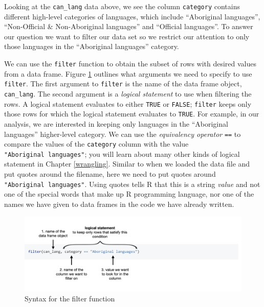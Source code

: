 \documentclass[
]{book}
\begin{document}
Looking at the \texttt{can\_lang} data above, we see the column \texttt{category} contains different
high-level categories of languages, which include ``Aboriginal languages'',
``Non-Official \& Non-Aboriginal languages'' and ``Official languages''. To answer
our question we want to filter our data set so we restrict our attention
to only those languages in the ``Aboriginal languages'' category.

We can use the \texttt{filter}  function to obtain the subset of rows with desired
values from a data frame. Figure \ref{fig:img-filter} outlines what arguments we need to specify to use \texttt{filter}. The first argument to \texttt{filter} is the name of the data frame
object, \texttt{can\_lang}. The second argument is a \emph{logical statement}  to use when
filtering the rows. A logical statement evaluates to either \texttt{TRUE} or \texttt{FALSE};
\texttt{filter} keeps only those rows for which the logical statement evaluates to \texttt{TRUE}.
For example, in our analysis, we are interested in keeping only languages in the
``Aboriginal languages'' higher-level category. We can use
the \emph{equivalency operator} \texttt{==}  to compare the values
of the \texttt{category} column with the value \texttt{"Aboriginal\ languages"}; you will learn about
many other kinds of logical statement in Chapter \ref{wrangling}. Similar to
when we loaded the data file and put quotes around the filename, here we need
to put quotes around \texttt{"Aboriginal\ languages"}. Using quotes tells R that this
is a string \emph{value}  and not one of the special words that make up R
programming language, nor one of the names we have given to data frames in the
code we have already written.

\begin{figure}
\includegraphics[width=1\linewidth]{img/filter_function} \caption{Syntax for the filter function}\label{fig:img-filter}
\end{figure}
\end{document}
